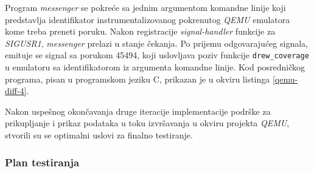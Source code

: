\documentclass[12pt,oneside]{memoir}
\newcommand{\kod}[1]{\texttt{#1}}
\newcommand{\strano}[1]{\textit{#1}}
\begin{document}
Program \strano{messenger} se pokreće sa jednim argumentom komandne linije koji predstavlja identifikator instrumentalizovanog pokrenutog \strano{QEMU} emulatora kome treba preneti poruku. Nakon registracije \strano{signal-handler} funkcije za \strano{SIGUSR1}, \strano{messenger} prelazi u stanje čekanja. Po prijemu odgovarajućeg signala, emituje se signal sa porukom 45494, koji uslovljava poziv funkcije \kod{drew\_coverage} u emulatoru sa identifikatorom iz argumenta komandne linije. Kod posredničkog programa, pisan u programskom jeziku C, prikazan je u okviru listinga \ref{qemu-diff-4}.

Nakon uspešnog okončavanja druge iteracije implementacije podrške za prikupljanje i prikaz podataka u toku izvršavanja u okviru projekta \strano{QEMU}, stvorili su se optimalni uslovi za finalno testiranje. 

\subsubsection{Plan testiranja}
\end{document}
